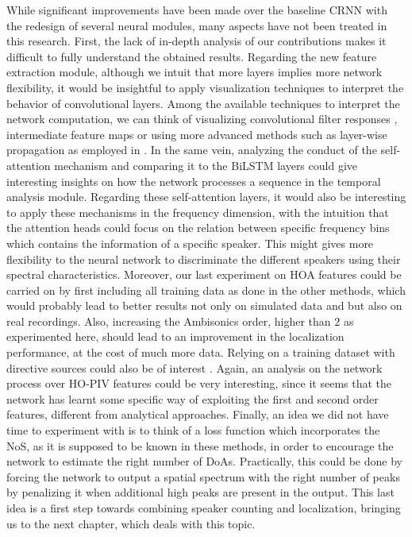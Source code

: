 While significant improvements have been made over the baseline CRNN with the redesign of several neural modules, many aspects have not been treated in this research. First, the lack of in-depth analysis of our contributions makes it difficult to fully understand the obtained results. Regarding the new feature extraction module, although we intuit that more layers implies more network flexibility, it would be insightful to apply visualization techniques to interpret the behavior of convolutional layers. Among the available techniques to interpret the network computation, we can think of visualizing convolutional filter responses \cite[p~167]{chollet_deep_2017}, intermediate feature maps \cite[p.~160]{chollet_deep_2017} or using more advanced methods such as layer-wise propagation \cite{bach_pixel-wise_2015} as employed in \cite{perotin_localisation_2019}. In the same vein, analyzing the conduct of the self-attention mechanism and comparing it to the BiLSTM layers could give interesting insights on how the network processes a sequence in the temporal analysis module. Regarding these self-attention layers, it would also be interesting to apply these mechanisms in the frequency dimension, with the intuition that the attention heads could focus on the relation between specific frequency bins which contains the information of a specific speaker. This might gives more flexibility to the neural network to discriminate the different speakers using their spectral characteristics.  Moreover, our last experiment on HOA features could be carried on by first including all training data as done in the other methods, which would probably lead to better results not only on simulated data and but also on real recordings. Also, increasing the Ambisonics order, higher than $2$ as experimented here, should lead to an improvement in the localization performance, at the cost of much more data. Relying on a training dataset with directive sources could also be of interest \cite{gelderblom_synthetic_2021}. Again, an analysis on the network process over HO-PIV features could be very interesting, since it seems that the network has learnt some specific way of exploiting the first and second order features, different from analytical approaches. Finally, an idea we did not have time to experiment with is to think of a loss function which incorporates the NoS, as it is supposed to be known in these methods, in order to encourage the network to estimate the right number of DoAs. Practically, this could be done by forcing the network to output a spatial spectrum with the right number of peaks by penalizing it when additional high peaks are present in the output. This last idea is a first step towards combining speaker counting and localization, bringing us to the next chapter, which deals with this topic.